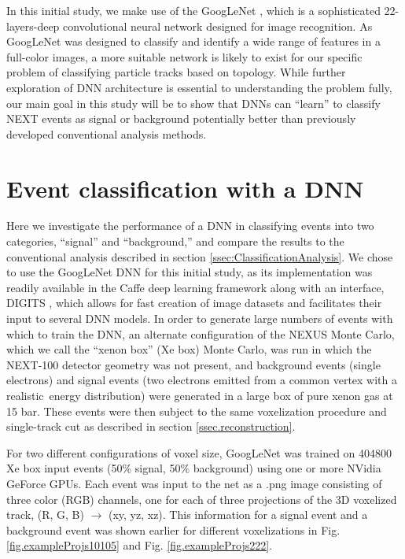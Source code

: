 \documentclass[a4paper,11pt]{article}
\begin{document}
In this initial study, we make use of the GoogLeNet \cite{Googlenet}, which is a sophisticated 22-layers-deep convolutional neural network designed for image recognition.  As GoogLeNet was
designed to classify and identify a wide range of features in a full-color images, a more suitable network is likely to exist for our specific problem of classifying particle tracks based on
topology.  While further exploration of DNN architecture is essential to understanding the problem fully, our main goal in this study will be to show that DNNs can ``learn'' to classify 
NEXT events as signal or background potentially better than previously developed conventional analysis methods.

\section{Event classification with a DNN}

Here we investigate the performance of a DNN in classifying events into two categories, ``signal'' and ``background,'' and compare the results to the conventional analysis described in
section \ref{ssec:ClassificationAnalysis}.  We chose to use the GoogLeNet DNN for this initial study, as its implementation was readily available in the Caffe \cite{jia2014caffe}
deep learning framework along with an interface, DIGITS \cite{DIGITS}, which allows for fast creation of image datasets and facilitates their input to several DNN models.  
In order to generate large numbers of events with which to train the DNN, an alternate configuration of the NEXUS Monte Carlo, which we call the ``xenon box'' (Xe box) Monte Carlo, 
was run in which the NEXT-100 detector geometry was not present, and background events (single electrons) and signal events (two electrons emitted from a common vertex with a realistic 
\bbonu\,energy distribution) were generated in a large box of pure xenon gas at 15 bar.  These events were then subject to the same voxelization procedure and single-track cut as described in 
section \ref{ssec.reconstruction}.  

For two different configurations of voxel size, GoogLeNet was trained on 404800 Xe box input events (50\% signal, 50\% background) using one or more NVidia GeForce GPUs.  Each event was input to the net as a .png image 
consisting of three color (RGB) channels, one for each of three projections of the 3D voxelized track, (R, G, B) $\rightarrow$ (xy, yz, xz).  This information for a signal event and a background event
was shown earlier for different voxelizations in Fig. \ref{fig.exampleProjs10105} and Fig. \ref{fig.exampleProjs222}.
\end{document}
